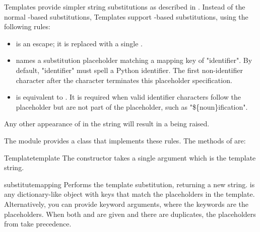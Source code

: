 Templates provide simpler string substitutions as described in .
Instead of the normal \samp{\%}-based substitutions, Templates support
\samp{\$}-based substitutions, using the following rules:

\begin{itemize}
\item \samp{\$\$} is an escape; it is replaced with a single \samp{\$}.

\item {} names a substitution placeholder matching a mapping
       key of "identifier".  By default, "identifier" must spell a Python
       identifier.  The first non-identifier character after the \samp{\$}
       character terminates this placeholder specification.

\item {} is equivalent to .  It is
      required when valid identifier characters follow the placeholder but are
      not part of the placeholder, such as "\$\{noun\}ification".
\end{itemize}

Any other appearance of \samp{\$} in the string will result in a
 being raised.


The  module provides a  class that implements
these rules.  The methods of  are:

\begin{classdesc}{Template}{template}
The constructor takes a single argument which is the template string.
\end{classdesc}

\begin{methoddesc}[Template]{substitute}{mapping}
Performs the template substitution, returning a new string.   is
any dictionary-like object with keys that match the placeholders in the
template.  Alternatively, you can provide keyword arguments, where the
keywords are the placeholders.  When both  and  are
given and there are duplicates, the placeholders from  take
precedence.
\end{methoddesc}

